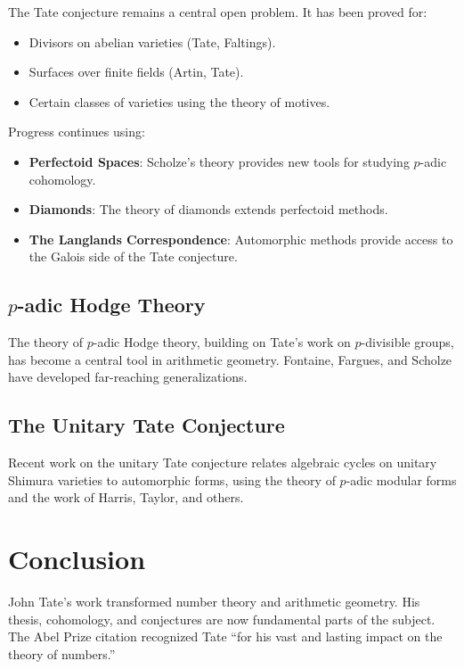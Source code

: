 The Tate conjecture remains a central open problem. It has been proved for:
\begin{itemize}
\item Divisors on abelian varieties (Tate, Faltings).
\item Surfaces over finite fields (Artin, Tate).
\item Certain classes of varieties using the theory of motives.
\end{itemize}

Progress continues using:
\begin{itemize}
\item \textbf{Perfectoid Spaces}: Scholze's theory provides new tools for studying $p$-adic cohomology.
\item \textbf{Diamonds}: The theory of diamonds extends perfectoid methods.
\item \textbf{The Langlands Correspondence}: Automorphic methods provide access to the Galois side of the Tate conjecture.
\end{itemize}

\subsection{\texorpdfstring{$p$}{p}-adic Hodge Theory}

The theory of $p$-adic Hodge theory, building on Tate's work on $p$-divisible groups, has become a central tool in arithmetic geometry. Fontaine, Fargues, and Scholze have developed far-reaching generalizations.

\subsection{The Unitary Tate Conjecture}

Recent work on the unitary Tate conjecture relates algebraic cycles on unitary Shimura varieties to automorphic forms, using the theory of $p$-adic modular forms and the work of Harris, Taylor, and others.

\section{Conclusion}

John Tate's work transformed number theory and arithmetic geometry. His thesis, cohomology, and conjectures are now fundamental parts of the subject. The Abel Prize citation recognized Tate ``for his vast and lasting impact on the theory of numbers.''

